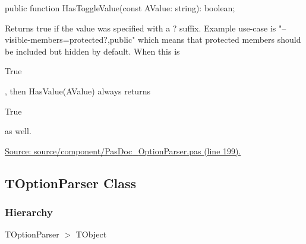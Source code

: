 \documentclass{report}
\newif\ifpdf
\begin{document}
\label{PasDoc_OptionParser.TSetOption-HasToggleValue}
\begin{list}{}{
\setlength{\itemindent}{0cm}
\setlength{\listparindent}{0cm}
\setlength{\leftmargin}{\evensidemargin}
\addtolength{\leftmargin}{\tmplength}
\settowidth{\labelsep}{X}
\addtolength{\leftmargin}{\labelsep}
\setlength{\labelwidth}{\tmplength}
}
\item[\textbf{Declaration}\hfill]
\ifpdf
\begin{flushleft}
\fi
\begin{ttfamily}
public function HasToggleValue(const AValue: string): boolean;\end{ttfamily}

\ifpdf
\end{flushleft}
\fi

\par
\item[\textbf{Description}]
Returns true if the value was specified with a ? suffix. Example use{-}case is "--visible{-}members=protected?,public" which means that protected members should be included but hidden by default. When this is \begin{ttfamily}True\end{ttfamily}, then HasValue(AValue) always returns \begin{ttfamily}True\end{ttfamily} as well.\par
\href{https://github.com/pasdoc/pasdoc/blob/master/source/component/PasDoc_OptionParser.pas#L199}{Source: source/component/PasDoc{\_}OptionParser.pas (line 199).}

\end{list}
\ifpdf
\subsection*{\large{\textbf{TOptionParser Class}}\normalsize\hspace{1ex}\hrulefill}
\else
\subsection*{TOptionParser Class}
\fi
\label{PasDoc_OptionParser.TOptionParser}
\subsubsection*{\large{\textbf{Hierarchy}}\normalsize\hspace{1ex}\hfill}
TOptionParser {$>$} TObject
\end{document}
